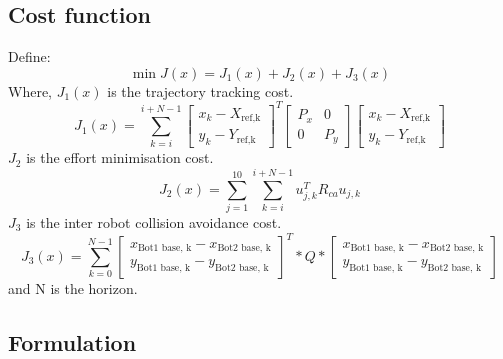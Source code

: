 \documentclass[12pt,english]{report}
\begin{document}
\subsection{Cost function}
Define:\\
\begin{equation}
    \min J(x) = J_1(x) + J_2(x) + J_3(x)
\end{equation}
Where,  $J_1(x)$ is the trajectory tracking cost.
\begin{equation*}
    J_1(x) = \sum _{k=i} ^ {i+N-1} \begin{bmatrix}
        x_k - X_{\text{ref,k}} \\
        y_k - Y_{\text{ref,k}}
    \end{bmatrix}^T 
    \begin{bmatrix}
        P_x & 0 \\ 
        0 & P_y
    \end{bmatrix} \begin{bmatrix}
        x_k - X_{\text{ref,k}} \\
        y_k - Y_{\text{ref,k}}
    \end{bmatrix}
\end{equation*}
$J_2$ is the effort minimisation cost.
\begin{equation*}
    J_2(x) =\sum_{j=1}^{10} \sum_ {k=i}^ {i+N-1} u_{j,k}^T R_{ca} u_{j,k}
\end{equation*}
$J_3$ is the inter robot collision avoidance cost.
\begin{equation*}
    J_3(x) = \sum_{k=0}^{N-1}\begin{bmatrix}
        x_{\text{Bot1 base, k}} - x_{\text{Bot2 base, k}} \\
        y_{\text{Bot1 base, k}} - y_{\text{Bot2 base, k}}
    \end{bmatrix}^T * Q * \begin{bmatrix}
        x_{\text{Bot1 base, k}} - x_{\text{Bot2 base, k}} \\
        y_{\text{Bot1 base, k}} - y_{\text{Bot2 base, k}}
    \end{bmatrix}
\end{equation*}
and N is the horizon.
\subsection{Formulation}
\end{document}
